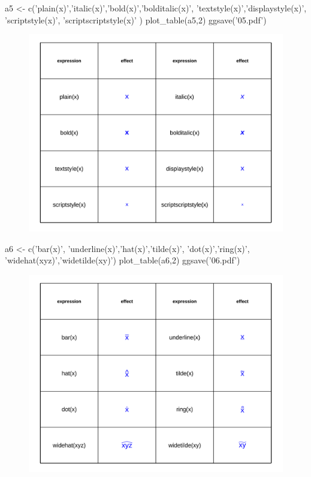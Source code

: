 \documentclass[10 pt,landscape]{article}
\begin{document}
\begin{multicols*}{3}
      \begin{R}
a5 <- c('plain(x)','italic(x)','bold(x)','bolditalic(x)',
        'textstyle(x)','displaystyle(x)',
        'scriptstyle(x)', 'scriptscriptstyle(x)'
)
plot_table(a5,2)
ggsave('05.pdf')
      \end{R}
      \begin{figure}[H]
      \centering
        \includegraphics[width = 1\linewidth]{05.pdf}
      \end{figure}
     
     \begin{R}
a6 <- c('bar(x)', 'underline(x)','hat(x)','tilde(x)',
        'dot(x)','ring(x)',
        'widehat(xyz)','widetilde(xy)')
plot_table(a6,2)
ggsave('06.pdf')    
     \end{R} 
     \begin{figure}[H]
      \centering
        \includegraphics[width = 1\linewidth]{06.pdf}
      \end{figure}
      

\end{multicols*}
\end{document}
